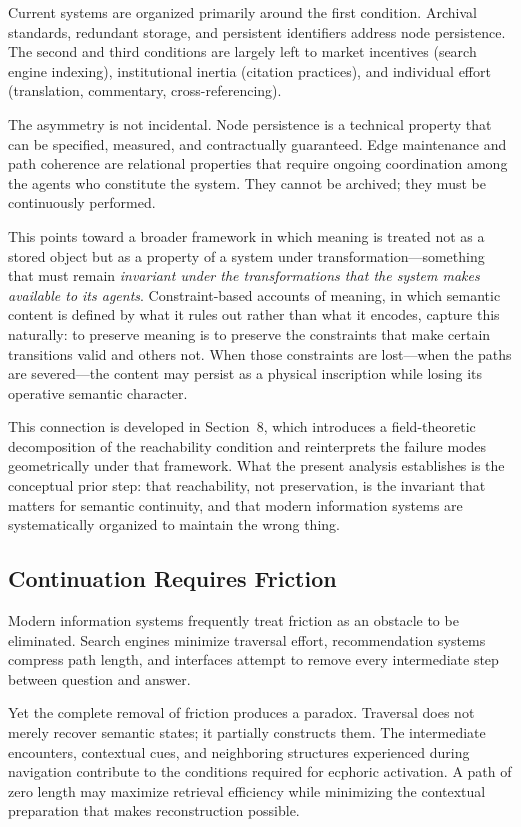 \documentclass[12pt]{article}
\begin{document}
Current systems are organized primarily around the first condition.
Archival standards, redundant storage, and persistent identifiers address node
persistence.
The second and third conditions are largely left to market incentives
(search engine indexing), institutional inertia (citation practices), and
individual effort (translation, commentary, cross-referencing).

The asymmetry is not incidental.
Node persistence is a technical property that can be specified, measured, and
contractually guaranteed.
Edge maintenance and path coherence are relational properties that require
ongoing coordination among the agents who constitute the system.
They cannot be archived; they must be continuously performed.

This points toward a broader framework in which meaning is treated not as a
stored object but as a property of a system under transformation---something
that must remain \emph{invariant under the transformations that the system
makes available to its agents}.
Constraint-based accounts of meaning, in which semantic content is defined
by what it rules out rather than what it encodes, capture this naturally:
to preserve meaning is to preserve the constraints that make certain
transitions valid and others not.
When those constraints are lost---when the paths are severed---the content
may persist as a physical inscription while losing its operative semantic
character.

This connection is developed in Section~8, which introduces a field-theoretic
decomposition of the reachability condition and reinterprets the failure modes
geometrically under that framework.
What the present analysis establishes is the conceptual prior step: that
reachability, not preservation, is the invariant that matters for semantic
continuity, and that modern information systems are systematically organized
to maintain the wrong thing.

\subsection{Continuation Requires Friction}

Modern information systems frequently treat friction as an obstacle to be
eliminated.
Search engines minimize traversal effort, recommendation systems compress
path length, and interfaces attempt to remove every intermediate step
between question and answer.

Yet the complete removal of friction produces a paradox.
Traversal does not merely recover semantic states; it partially constructs
them.
The intermediate encounters, contextual cues, and neighboring structures
experienced during navigation contribute to the conditions required for
ecphoric activation.
A path of zero length may maximize retrieval efficiency while minimizing
the contextual preparation that makes reconstruction possible.
\end{document}
